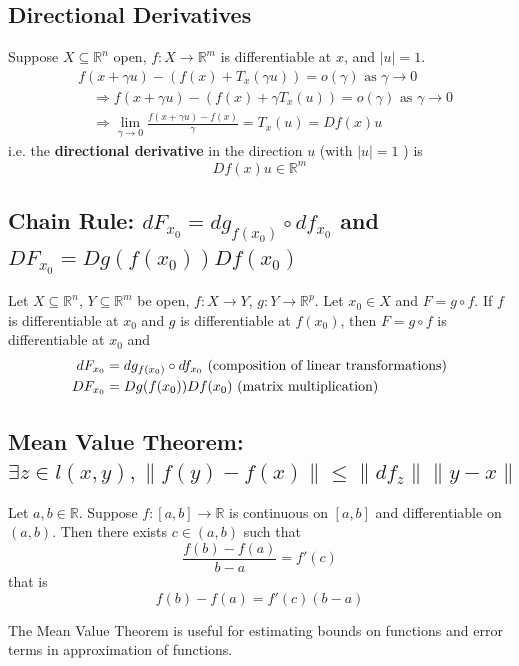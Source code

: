 \documentclass[11pt]{elegantbook}
\begin{document}
\subsection{Directional Derivatives}
\begin{definition}
    \normalfont
    Suppose $X \subseteq \mathbb{R}^n$ open, $f: X \rightarrow \mathbb{R}^m$ is differentiable at $x$, and $|u|=1$.
    $$
    \begin{aligned}
    & f(x+\gamma u)-\left(f(x)+T_x(\gamma u)\right)=o(\gamma) \text { as } \gamma \rightarrow 0 \\
    & \quad \Rightarrow f(x+\gamma u)-\left(f(x)+\gamma T_x(u)\right)=o(\gamma) \text { as } \gamma \rightarrow 0 \\
    & \quad \Rightarrow \lim _{\gamma \rightarrow 0} \frac{f(x+\gamma u)-f(x)}{\gamma}=T_x(u)=Df(x) u
    \end{aligned}
    $$
    i.e. the \textbf{directional derivative} in the direction $u$ (with $|u|=1$ ) is
    $$
    Df(x) u \in \mathbb{R}^m
    $$
\end{definition}


\subsection{Chain Rule: $d F_{x_0}= d g_{f(x_0)} \circ d f_{x_0}$ and $D F_{x_0}= D g (f(x_0)) D f (x_0)$}
\begin{theorem}
    Let $X \subseteq \mathbb{R}^n$, $Y \subseteq \mathbb{R}^m$ be open, $f : X \rightarrow Y$, $g : Y \rightarrow \mathbb{R}^p$. Let $x_0\in X$ and $F = g \circ f$. If $f$ is differentiable at $x_0$ and $g$ is differentiable at $f(x_0)$, then $F = g \circ f$ is differentiable at $x_0$ and
    \begin{equation}
        \begin{aligned}
            d F_{x_0}&= d g_{f(x_0)} \circ d f_{x_0} \textnormal{ (composition of linear transformations)}\\
            D F_{x_0}&= D g (f(x_0)) D f (x_0) \textnormal{ (matrix multiplication)}\\
        \end{aligned}
        \nonumber
    \end{equation}
\end{theorem}

\subsection{Mean Value Theorem: $\exists z\in l(x,y),\|f(y)-f(x)\|\leq \|df_z\| \|y-x\|$}
\begin{theorem}
    Let $a, b \in \mathbb{R}$. Suppose $f : [a, b] \rightarrow \mathbb{R}$ is continuous on $[a, b]$ and differentiable on $(a, b)$. Then there exists $c \in (a, b)$ such that $$\frac{f(b)-f(a)}{b-a}=f'(c)$$
    that is $$f(b)-f(a)=f'(c)(b-a)$$
\end{theorem}
\begin{note}
    The Mean Value Theorem is useful for estimating bounds on functions and error terms in approximation of functions.
\end{note}
\end{document}
